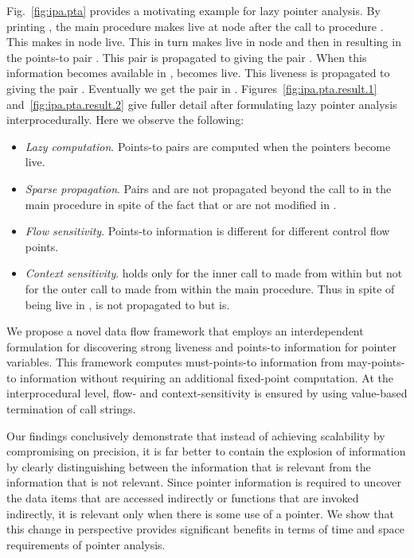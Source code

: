 \documentclass{llncs}
\newcommand{\pt}[2]{\text{}}
\begin{document}
Fig.~\ref{fig:ipa.pta} provides a motivating example for lazy pointer
analysis.
By printing , the main procedure makes  live at node 
after the call to procedure .
This makes  in node  live. This in turn
makes  live in node  and then in  resulting in
the points-to pair \pt{w}{x}. This pair is propagated to 
giving the pair \pt{z}{x}. When this information becomes available
in ,  becomes live. This liveness is propagated to 
giving the pair \pt{x}{y}. Eventually we get the pair \pt{z}{y}
in .
Figures~\ref{fig:ipa.pta.result.1} and~\ref{fig:ipa.pta.result.2} give
fuller detail after formulating lazy pointer analysis interprocedurally.
Here we observe the following:
\begin{itemize}
\item {\em Lazy computation}. Points-to pairs are computed when the
      pointers become live.
\item {\em Sparse propagation}. Pairs \pt{x}{y} and \pt{w}{x} are not 
      propagated beyond the call to  in the main procedure in spite of 
      the fact that  or  are not modified in .
\item {\em Flow sensitivity}. Points-to information is different for
      different control flow points.
\item {\em Context sensitivity}. \pt{z}{x} holds only for the inner call to 
      made from within  but not for the outer call to  made from within the
      main procedure. Thus in spite of  being live in , 
      \pt{z}{x} is not propagated to  but \pt{z}{y} is.
\end{itemize}

We propose a novel data flow framework that employs an
interdependent formulation for discovering strong liveness and
points-to information for pointer variables. This framework computes
must-points-to information from may-points-to information without
requiring an additional fixed-point computation. At the interprocedural
level, flow- and context-sensitivity is ensured by using value-based
termination of call strings. 


Our findings conclusively demonstrate that instead of achieving scalability
by compromising on precision, it is far better to contain the explosion
of information by clearly distinguishing between the information that
is relevant from the information that is not relevant. Since pointer
information is required to uncover the data items that are accessed
indirectly or functions that are invoked indirectly, it is relevant
only when there is some use of a pointer. We show that this change in
perspective provides significant benefits in terms of time and space
requirements of pointer analysis.
\end{document}
